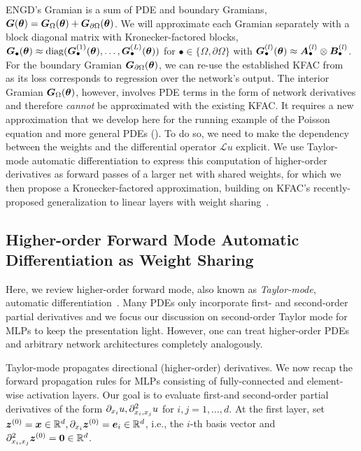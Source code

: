 
ENGD's Gramian is a sum of PDE and boundary Gramians, ${\bm{G}}({\bm{\theta}})= {\bm{G}}_\Omega({\bm{\theta}}) + {\bm{G}}_{\partial\Omega}({\bm{\theta}})$.
We will approximate each Gramian separately with a block diagonal matrix with Kronecker-factored blocks, ${\bm{G}}_{\bullet}({\bm{\theta}}) \approx \operatorname{diag}({\bm{G}}^{(1)}_{\bullet}({\bm{\theta}}), \dots, {\bm{G}}^{(L)}_{\bullet}({\bm{\theta}}))$ for $\bullet \in \{\Omega, \partial\Omega\}$ with ${\bm{G}}^{(l)}_{\bullet}({\bm{\theta}}) \approx {\bm{A}}^{(l)}_{\bullet} \otimes {\bm{B}}^{(l)}_{\bullet}$.
For the boundary Gramian ${\bm{G}}_{\partial\Omega}({\bm{\theta}})$, we can re-use the established KFAC from~ as its loss corresponds to regression over the network's output.
The interior Gramian ${\bm{G}}_\Omega({\bm{\theta}})$, however, involves PDE terms in the form of network derivatives and therefore \emph{cannot} be approximated with the existing KFAC.
It requires a new approximation that we develop here for the running example of the Poisson equation and more general PDEs ().
To do so, we need to make the dependency between the weights and the differential operator $\mathcal{L}u$ explicit.
We use Taylor-mode automatic differentiation to express this computation of higher-order derivatives as forward passes of a larger net with shared weights, for which we then propose a Kronecker-factored approximation, building on KFAC's recently-proposed generalization to linear layers with weight sharing~\cite{eschenhagen2023kroneckerfactored}.

\subsection{Higher-order Forward Mode Automatic Differentiation as Weight Sharing}
\label{sec:taylor-mode-AD}

Here, we review higher-order forward mode, also known as \emph{Taylor-mode}, automatic differentiation~\citep{griewank1996algorithm, griewank2008evaluating, bettencourt2019taylor}.
Many PDEs only incorporate first- and second-order partial derivatives and we focus our discussion on second-order Taylor mode for MLPs to keep the presentation light.
However, one can treat higher-order PDEs and arbitrary network architectures completely analogously.

Taylor-mode propagates directional (higher-order) derivatives.
We now recap the forward propagation rules for MLPs consisting of fully-connected and element-wise activation layers.
Our goal is to evaluate first-and second-order partial derivatives of the form $\partial_{{x}_i}u, \partial^2_{{x}_i, {x}_j}u$ for $i,j = 1, \dots, d$.
At the first layer, set ${\bm{z}}^{(0)} = {\bm{x}}\in\mathbb R^d, \partial_{x_i}{\bm{z}}^{(0)} = {\bm{e}}_i\in\mathbb R^d$, i.e., the $i$-th basis vector and $\partial^2_{x_i,x_j}{\bm{z}}^{(0)} = {\bm{0}} \in\mathbb R^d$.

